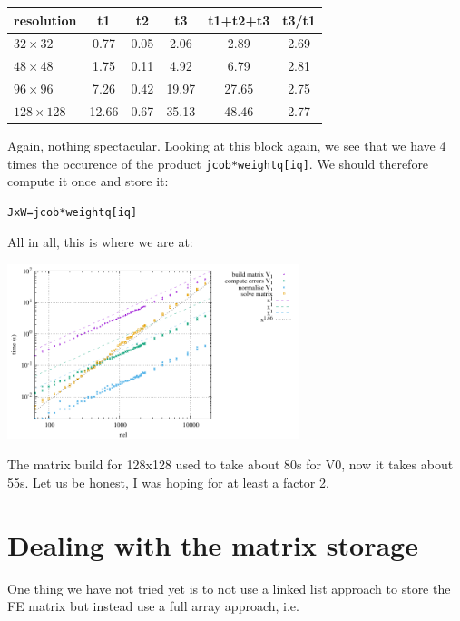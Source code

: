 \begin{center}
\begin{tabular}{lccccc}
\hline
resolution & t1 & t2 & t3 & t1+t2+t3 & t3/t1\\ 
\hline
\hline
$32\times 32$   &  0.77 & 0.05 &  2.06 &  2.89 & 2.69 \\
$48\times 48$   &  1.75 & 0.11 &  4.92 &  6.79 & 2.81 \\
$96\times 96$   &  7.26 & 0.42 & 19.97 & 27.65 & 2.75 \\
$128\times 128$ &  12.66& 0.67 & 35.13 & 48.46 & 2.77 \\ 
\hline
\end{tabular}
\end{center}
Again, nothing spectacular.
Looking at this block again, we see that we have 4 times the occurence of the product {\tt jcob*weightq[iq]}.
We should therefore compute it once and store it:
\begin{lstlisting}
JxW=jcob*weightq[iq]
\end{lstlisting}

All in all, this is where we are at:
\begin{center}
\includegraphics[width=8.5cm]{python_codes/fieldstone_150/results/times_V4}
\end{center}
The matrix build for 128x128 used to take about 80s for V0, now it takes 
about 55s. Let us be honest, I was hoping for at least a factor 2. 

\section*{Dealing with the matrix storage}

One thing we have not tried yet is to not use a linked list approach to store the 
FE matrix but instead use a full array approach, i.e.
 
